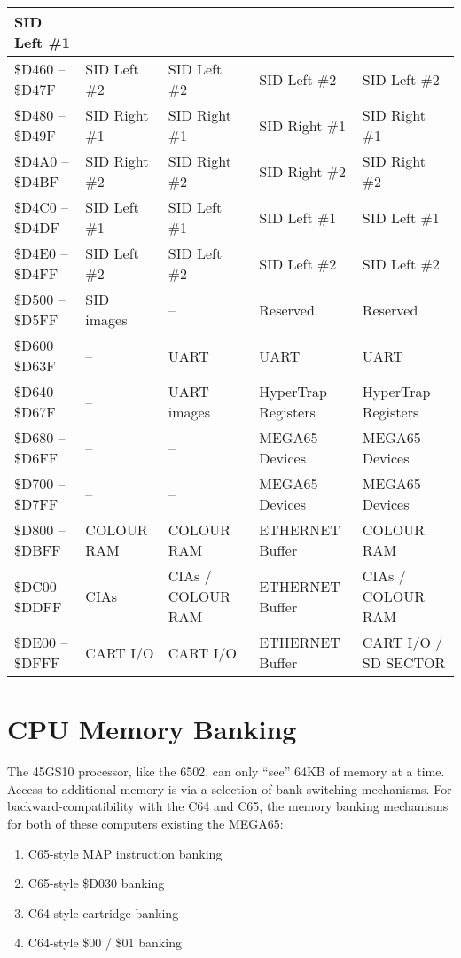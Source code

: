 \begin{longtable}{|p{2.2cm}|C{2cm}|C{2cm}|C{2cm}|C{2cm}|}
SID Left \#1 \\
\hline
\small \$D460 -- \$D47F & \small SID Left \#2 & SID Left \#2 & SID Left \#2 &
SID Left \#2 \\
\hline
\small \$D480 -- \$D49F & \small SID Right \#1 & SID Right \#1 & SID Right \#1 &
SID Right \#1 \\
\hline
\small \$D4A0 -- \$D4BF & \small SID Right \#2 & SID Right \#2 & SID Right \#2 &
SID Right \#2 \\
\hline
\small \$D4C0 -- \$D4DF & \small SID Left \#1 & SID Left \#1 & SID Left \#1 &
SID Left \#1 \\
\hline
\small \$D4E0 -- \$D4FF & \small SID Left \#2 & SID Left \#2 & SID Left \#2 &
SID Left \#2 \\
\hline
\small \$D500 -- \$D5FF & \small SID images & -- & Reserved & Reserved \\
\hline
\small \$D600 -- \$D63F & \small -- & UART & UART & UART \\
\hline
\small \$D640 -- \$D67F & \small -- & UART images & HyperTrap
Registers & HyperTrap Registers \\
\hline
\small \$D680 -- \$D6FF & \small -- & -- & MEGA65 Devices & MEGA65 Devices \\
\hline
\small \$D700 -- \$D7FF & \small -- & -- & MEGA65 Devices & MEGA65 Devices \\
\hline
\small \$D800 -- \$DBFF & \small COLOUR RAM & COLOUR RAM & ETHERNET Buffer & COLOUR RAM \\
\hline
\small \$DC00 -- \$DDFF & \small CIAs & CIAs / COLOUR RAM & ETHERNET Buffer & CIAs / COLOUR RAM \\
\hline
\small \$DE00 -- \$DFFF & \small CART I/O & CART I/O & ETHERNET Buffer & CART I/O / SD SECTOR \\
\hline
\end{longtable}

\section{CPU Memory Banking}
\label{sec:membanking}

The 45GS10 processor, like the 6502, can only ``see'' 64KB of memory
at a time. Access to additional memory is via a selection of
bank-switching mechanisms.  For backward-compatibility with the C64
and C65, the memory banking mechanisms for both of these computers
existing the MEGA65:
\begin{enumerate}
\item C65-style MAP instruction banking
\item C65-style \$D030 banking
\item C64-style cartridge banking
\item C64-style \$00 / \$01 banking
\end{enumerate}


